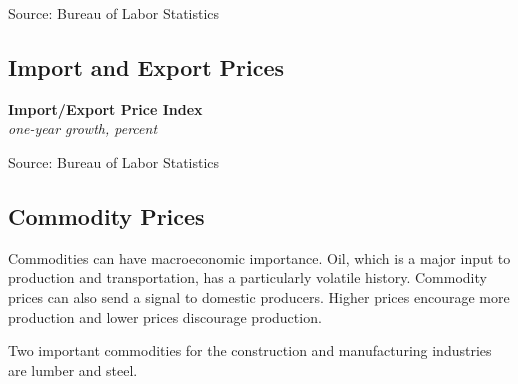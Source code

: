 \documentclass{report}
\makeatletter
\newcommand{\tbllink}[1]{\href{https://raw.githubusercontent.com/bdecon/US-chartbook/master/chartbook/data/#1}{\faTable}}
\newcommand*\short[1]{\expandafter\@gobbletwo\number\numexpr#1\relax}
\newcommand{\dateaxisticks}{
		date coordinates in=x, axis line style={draw=none},
		xmax={2024-01-31},
		max space between ticks=40,	    
		xtick={{1990-01-01}, {1992-01-01}, {1994-01-01}, 
			{1996-01-01}, {1998-01-01}, {2000-01-01}, 
			{2002-01-01}, {2004-01-01}, {2006-01-01},
			{2008-01-01}, {2010-01-01}, {2012-01-01}, {2014-01-01},
		    {2016-01-01}, {2018-01-01}, {2020-01-01}, {2022-01-01}, 
		    {2024-01-01}, {2026-01-01}},
		minor xtick={{1989-01-01}, {1991-01-01}, {1993-01-01},
			{1995-01-01}, {1997-01-01}, {1999-01-01}, 
			{2001-01-01}, {2003-01-01}, {2005-01-01}, {2007-01-01},
		    {2009-01-01}, {2011-01-01}, {2013-01-01}, {2015-01-01},
		    {2017-01-01}, {2019-01-01}, {2021-01-01}, {2023-01-01}, 
		    {2025-01-01}, {2027-01-01}},
		enlarge y limits={0.06}, enlarge x limits={0.01},
		xticklabel style={align=center, yshift=-2pt}, tick label style={inner sep=0pt},
		}
\newcommand{\bbar}[2]{extra #1 ticks = {{#2}}, extra #1 tick labels = ,
		extra #1 tick style = {grid=major, grid style={thick, black!25}},}
\newcommand{\stdline}[4]{\addplot[very thick, no markers, color=#1] 
		table [x=#2, y=#3, col sep=comma] {#4};	}
\newcommand{\thickline}[4]{\addplot[ultra thick, no markers, color=#1] 
		table [x=#2, y=#3, col sep=comma] {#4};	}
\newcommand{\rbars}{
		\fill[color=black!10] (axis cs:{1990-07-01},\pgfkeysvalueof{/pgfplots/ymin})
			rectangle (axis cs:{1991-03-01}, \pgfkeysvalueof{/pgfplots/ymax});
		\fill[color=black!10] (axis cs:{2007-12-01},\pgfkeysvalueof{/pgfplots/ymin})
			rectangle (axis cs:{2009-07-01}, \pgfkeysvalueof{/pgfplots/ymax});
		\fill[color=black!10] (axis cs:{2001-03-01},\pgfkeysvalueof{/pgfplots/ymin})
			rectangle (axis cs:{2001-11-01}, \pgfkeysvalueof{/pgfplots/ymax});
		\fill[color=black!10] (axis cs:{2020-02-01},\pgfkeysvalueof{/pgfplots/ymin})
			rectangle (axis cs:{2020-05-01}, \pgfkeysvalueof{/pgfplots/ymax});}
\makeatother
\begin{document}
{{\begin{minipage}{1.0\textwidth}
\footnotesize{Source: Bureau of Labor Statistics} \hfill \tbllink{ppi_monthly.csv}
\end{minipage}
\newpage
\vspace*{-10mm}

\begin{minipage}{1.0\textwidth}
\hypertarget{prex}{\label{prex}}
\subsection*{Import and Export Prices}
\small 
{}
\vspace{0.5mm}

\normalsize \textbf{Import/Export Price Index}\\
\footnotesize{\textit{one-year growth, percent}}\\
\vspace{3.2cm}

\hspace{3mm} 

\footnotesize{Source: Bureau of Labor Statistics} \hfill \tbllink{mxpi.csv}
\vspace{2mm}

\hypertarget{prco}{\label{prco}}
\subsection*{Commodity Prices}
\vspace*{-1mm}

\small Commodities can have macroeconomic importance. Oil, which is a major input to production and transportation, has a particularly volatile history. Commodity prices can also send a signal to domestic producers. Higher prices encourage more production and lower prices discourage production. 

Two important commodities for the construction and manufacturing industries are lumber and steel.  
 
\vspace{1mm}


\end{minipage}}}
\end{document}
